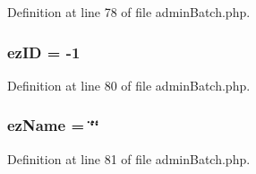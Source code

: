 Definition at line 78 of file admin\-Batch.\-php.

\hypertarget{admin_batch_8php_adf465cadf95987152966d26567509f92}{
\subsubsection[{ez\-I\-D}]{\setlength{\rightskip}{0pt plus 5cm}ez\-I\-D = -\/1}}\label{admin_batch_8php_adf465cadf95987152966d26567509f92}


Definition at line 80 of file admin\-Batch.\-php.

\hypertarget{admin_batch_8php_a052a753c7ee63d24285f81cefddb7d34}{
\subsubsection[{ez\-Name}]{\setlength{\rightskip}{0pt plus 5cm}ez\-Name = \char`\"{}\char`\"{}}}\label{admin_batch_8php_a052a753c7ee63d24285f81cefddb7d34}


Definition at line 81 of file admin\-Batch.\-php.

